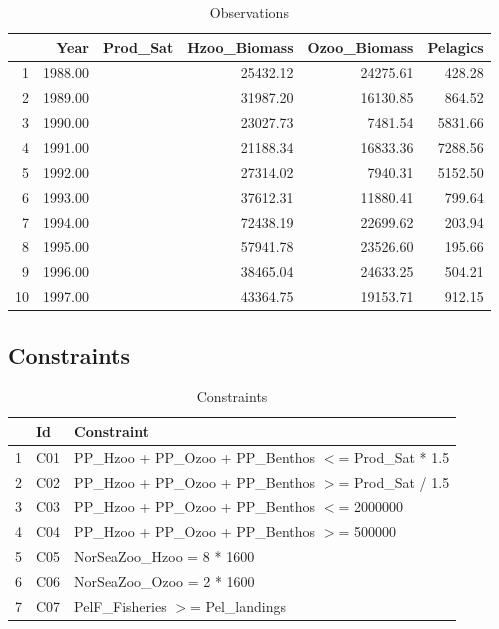 \documentclass{article}
\begin{document}
\begin{table}[ht]
\centering
\begin{tabular}{rrrrrr}
  \hline
 & Year & Prod\_Sat & Hzoo\_Biomass & Ozoo\_Biomass & Pelagics \\ 
  \hline
1 & 1988.00 &  & 25432.12 & 24275.61 & 428.28 \\ 
  2 & 1989.00 &  & 31987.20 & 16130.85 & 864.52 \\ 
  3 & 1990.00 &  & 23027.73 & 7481.54 & 5831.66 \\ 
  4 & 1991.00 &  & 21188.34 & 16833.36 & 7288.56 \\ 
  5 & 1992.00 &  & 27314.02 & 7940.31 & 5152.50 \\ 
  6 & 1993.00 &  & 37612.31 & 11880.41 & 799.64 \\ 
  7 & 1994.00 &  & 72438.19 & 22699.62 & 203.94 \\ 
  8 & 1995.00 &  & 57941.78 & 23526.60 & 195.66 \\ 
  9 & 1996.00 &  & 38465.04 & 24633.25 & 504.21 \\ 
  10 & 1997.00 &  & 43364.75 & 19153.71 & 912.15 \\ 
   \hline
\end{tabular}
\caption{Observations} 
\label{Observations}
\end{table}

\subsection{Constraints}

\begin{table}[ht]
\centering
\begin{tabular}{rll}
  \hline
 & Id & Constraint \\ 
  \hline
1 & C01 & PP\_Hzoo + PP\_Ozoo + PP\_Benthos $<$= Prod\_Sat * 1.5  \\ 
  2 & C02 & PP\_Hzoo + PP\_Ozoo + PP\_Benthos $>$= Prod\_Sat / 1.5  \\ 
  3 & C03 & PP\_Hzoo + PP\_Ozoo + PP\_Benthos $<$= 2000000  \\ 
  4 & C04 & PP\_Hzoo + PP\_Ozoo + PP\_Benthos $>$= 500000  \\ 
  5 & C05 & NorSeaZoo\_Hzoo = 8 * 1600  \\ 
  6 & C06 & NorSeaZoo\_Ozoo = 2 * 1600  \\ 
  7 & C07 & PelF\_Fisheries $>$= Pel\_landings  \\ 
   \hline
\end{tabular}
\caption{Constraints} 
\label{Constraints}
\end{table}
\clearpage
\end{document}
